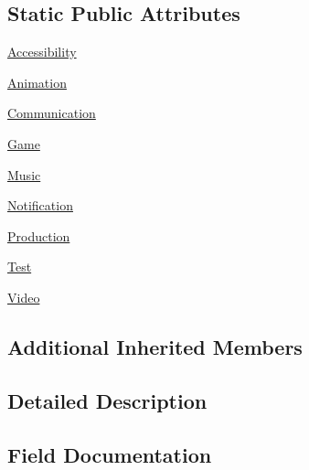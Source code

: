\subsection*{Static Public Attributes}
\begin{DoxyCompactItemize}
\item 
\hyperlink{classvlc_1_1_media_player_role_a6cab7529dc10ea0876dbeeb689dfa2a7}{Accessibility}
\item 
\hyperlink{classvlc_1_1_media_player_role_a657833f0c453f89346fd4916e1bbe550}{Animation}
\item 
\hyperlink{classvlc_1_1_media_player_role_a836c27e2d64d0efa4a526150bdf6f3e5}{Communication}
\item 
\hyperlink{classvlc_1_1_media_player_role_a4ec25c3351f43b6c631aedeb9e14d46a}{Game}
\item 
\hyperlink{classvlc_1_1_media_player_role_af0f11632042073b26283ebf65c46b25f}{Music}
\item 
\hyperlink{classvlc_1_1_media_player_role_a9b7018c6a58f6d63a9446fea1f12ad89}{Notification}
\item 
\hyperlink{classvlc_1_1_media_player_role_a80472a1a1f2b25b637c31699fc2e1293}{Production}
\item 
\hyperlink{classvlc_1_1_media_player_role_ab085d1bf4cff8b1045750706b11f8662}{Test}
\item 
\hyperlink{classvlc_1_1_media_player_role_a121bfee6ba71defb0cf9470d797f1817}{Video}
\end{DoxyCompactItemize}
\subsection*{Additional Inherited Members}


\subsection{Detailed Description}
 

\subsection{Field Documentation}
\mbox{\label{classvlc_1_1_media_player_role_a6cab7529dc10ea0876dbeeb689dfa2a7}} 

